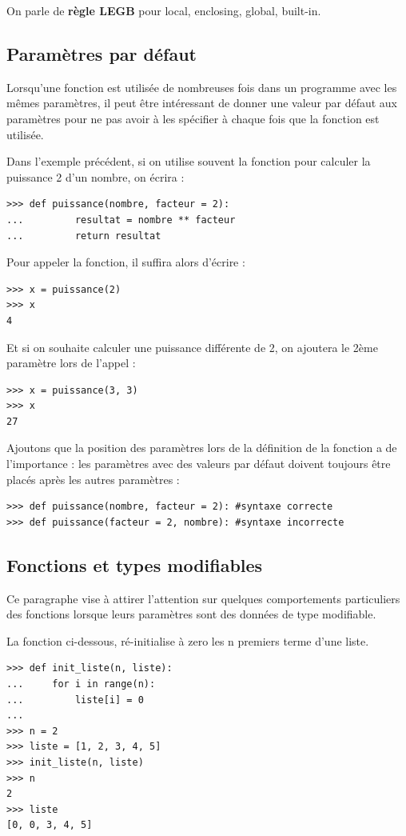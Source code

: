 \documentclass[12pt, a4paper]{article}
\begin{document}
On parle de \textbf{règle LEGB} pour local, enclosing, global, built-in.


\subsection{Paramètres par défaut}
Lorsqu'une fonction est utilisée de nombreuses fois dans un programme avec les mêmes paramètres, il peut être intéressant de donner une valeur par défaut aux paramètres pour ne pas avoir à les spécifier à chaque fois que la fonction est utilisée.

Dans l'exemple précédent, si on utilise souvent la fonction pour calculer la puissance 2 d'un nombre, on écrira :
\begin{lstlisting}
>>> def puissance(nombre, facteur = 2):
...			resultat = nombre ** facteur
... 		return resultat
\end{lstlisting}

Pour appeler la fonction, il suffira alors d'écrire :
\begin{lstlisting}
>>> x = puissance(2)
>>> x
4
\end{lstlisting}

Et si on souhaite calculer une puissance différente de 2, on ajoutera le 2ème paramètre lors de l'appel :
\begin{lstlisting}
>>> x = puissance(3, 3)
>>> x
27
\end{lstlisting}

Ajoutons que la position des paramètres lors de la définition de la fonction a de l'importance : les paramètres avec des valeurs par défaut doivent toujours être placés après les autres paramètres :
\begin{lstlisting}
>>> def puissance(nombre, facteur = 2):	#syntaxe correcte
>>> def puissance(facteur = 2, nombre):	#syntaxe incorrecte
\end{lstlisting}


\subsection{Fonctions et types modifiables}
Ce paragraphe vise à attirer l'attention sur quelques comportements particuliers des fonctions lorsque leurs paramètres sont des données de type modifiable.

La fonction ci-dessous, ré-initialise à zero les n premiers terme d'une liste.
\begin{lstlisting}
>>> def init_liste(n, liste):
...	    for i in range(n):
...	        liste[i] = 0
...
>>> n = 2
>>> liste = [1, 2, 3, 4, 5]
>>> init_liste(n, liste)
>>> n
2
>>> liste
[0, 0, 3, 4, 5]
\end{lstlisting}
\end{document}
